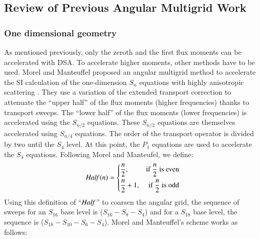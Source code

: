 \documentclass[preprint,10pt]{elsarticle}
\renewcommand{\(}{\left(}
\renewcommand{\)}{\right)}
\renewcommand{\[}{\left[}
\renewcommand{\]}{\right]}
\newcommand{\Half}{\text{\it Half\,}}
\begin{document}
\subsection{Review of Previous Angular Multigrid Work} 

\subsubsection{One dimensional geometry}

As mentioned previously, only the zeroth and the first flux moments can be
accelerated with DSA. To accelerate higher moments, other methods have to be
used. Morel and Manteuffel proposed an angular 
multigrid method to accelerate the SI calculation of the one-dimension 
$S_n$ equations with  highly anisotropic scattering 
\cite{multigrid_1d}. They use a variation of the extended
transport correction \cite{lathrop} to attenuate the ``upper half'' of the
flux moments (higher frequencies) thanks to transport sweeps. The ``lower half'' 
of the flux moments (lower frequencies) is accelerated using the $S_{n/2}$ 
equations. These $S_{n/2}$ equations are themselves 
accelerated using $S_{n/4}$ equations. The order of the transport operator is 
divided by two until the $S_4$ level. At this point, the $P_1$ equations are 
used to accelerate the $S_4$ equations. Following Morel and Manteufel, we define:
%
\begin{equation}
\Half(n) = \left\{
\begin{aligned}
&\frac{n}{2}, &\textrm{if $\frac{n}{2}$ is even}\\
&\frac{n}{2}+1, &\textrm{if $\frac{n}{2}$ is odd}
\end{aligned}
\right.
\end{equation}
%
Using this definition of ``$\Half$'' to coarsen the angular grid, the sequence
of sweeps for an $S_{16}$ base level is ($S_{16}-S_8-S_4$) and for a $S_{18}$ base level, 
the sequence is ($S_{18}-S_{10}-S_6-S_4$).
%
Morel and Manteuffel's scheme works as follows:
% 
\end{document}
